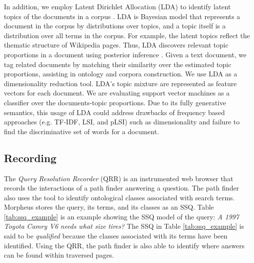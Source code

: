 In addition, we employ Latent Dirichlet Allocation (LDA) to identify latent topics of the documents in a corpus \cite{Blei2003latentdirichlet}.  LDA is Bayesian model that represents a document in the corpus by distributions over topics, and a topic itself is a distribution over all terms in the corpus.  For example, the latent topics reflect the thematic structure of Wikipedia pages. Thus, LDA discovers relevant topic proportions in a document using posterior inference \cite{Blei2003latentdirichlet}. Given a text document, we tag related documents by matching their similarity over the estimated topic proportions, assisting in ontology and corpora construction. We use LDA as a dimensionality reduction tool. LDA's topic mixture are represented as feature vectors for each document. We are evaluating support vector machines as a classifier over the documents-topic proportions.  Due to its fully generative semantics, this usage of LDA could address drawbacks of frequency based approaches (e.g. TF-IDF, LSI, and pLSI) such as dimensionality and failure to find the discriminative set of words for a document. 


\subsection{Recording}
\label{sec:query_processing}

The \emph{Query Resolution Recorder} (QRR) is an instrumented web browser that records the interactions of a path finder answering a question. The path finder also uses the tool to identify ontological classes associated with search terms. Morpheus stores the query, its terms, and its classes as an SSQ.  Table \ref{tab:ssq_example} is an example showing the SSQ model of the query: \emph{ A 1997 Toyota Camry V6 needs what size tires?} The SSQ in Table \ref{tab:ssq_example} is said to be \emph{qualified} because the classes associated with its terms have been identified. Using the QRR, the path finder is also able to identify where answers can be found within traversed pages.





